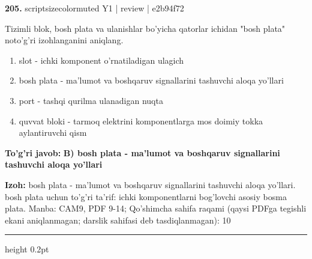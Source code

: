 \documentclass[10pt,a4paper]{article}
\begin{document}
{\bfseries\sffamily\color{ink} 205.} {scriptsizecolor{muted} Y1 | review | e2b94f72}
\par
Tizimli blok, bosh plata va ulanishlar bo'yicha qatorlar ichidan "bosh plata" noto'g'ri izohlanganini aniqlang.
\begin{enumerate}[label=\Alph*),leftmargin=9mm]
\item slot - ichki komponent o'rnatiladigan ulagich
\item bosh plata - ma'lumot va boshqaruv signallarini tashuvchi aloqa yo'llari
\item port - tashqi qurilma ulanadigan nuqta
\item quvvat bloki - tarmoq elektrini komponentlarga mos doimiy tokka aylantiruvchi qism
\end{enumerate}
\begin{tcolorbox}[enhanced,breakable,colback=teal!4,colframe=teal!60!black,boxrule=0.45pt,arc=1.2mm,left=2.7mm,right=2.7mm,top=1.8mm,bottom=1.8mm,before skip=2mm,after skip=2mm]
{\bfseries\sffamily\color{teal}To'g'ri javob:} \textbf{B) bosh plata - ma'lumot va boshqaruv signallarini tashuvchi aloqa yo'llari}
\par\smallskip
{\bfseries Izoh:} bosh plata - ma'lumot va boshqaruv signallarini tashuvchi aloqa yo'llari. bosh plata uchun to'g'ri ta'rif: ichki komponentlarni bog'lovchi asosiy bosma plata. Manba: CAM9, PDF 9-14; Qo'shimcha sahifa raqami (qaysi PDFga tegishli ekani aniqlanmagan; darslik sahifasi deb tasdiqlanmagan): 10
\end{tcolorbox}
\vspace{2mm}\hrule height 0.2pt\vspace{3mm}
\end{document}

